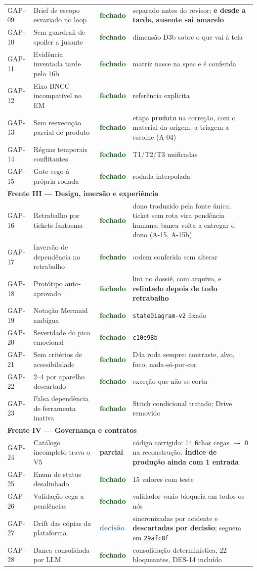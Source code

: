 \documentclass[11pt,a4paper]{article}
\newcommand{\ok}{\textcolor{DarkGreen}{\textbf{fechado}}}
\newcommand{\parcial}{\textcolor{DarkYellow}{\textbf{parcial}}}
\newcommand{\decisao}{\textcolor{SteelBlue}{\textbf{decisão}}}
\newcommand{\amarelo}{\textcolor{DarkYellow}{\textbf{amarelo}}}
\begin{document}
\begin{longtable}{@{}p{1.5cm} p{6.0cm} p{1.6cm} p{6.0cm}@{}}
GAP-09 & Brief de escopo esvaziado no loop & \ok & separado antes do revisor; \textbf{e desde a tarde, ausente sai \amarelo{}} \\
GAP-10 & Sem guardrail de spoiler a jusante & \ok & dimensão D3b sobre o que vai à tela \\
GAP-11 & Evidência inventada tarde pelo 16b & \ok & matriz nasce na spec e é conferida \\
GAP-12 & Eixo BNCC incompatível no EM & \ok & referência explícita \\
GAP-13 & Sem reexecução parcial de produto & \ok & etapa \texttt{produto} na correção, com o material da origem; a triagem a escolhe (A-04) \\
GAP-14 & Réguas temporais conflitantes & \ok & T1/T2/T3 unificadas \\
GAP-15 & Gate cego à própria rodada & \ok & rodada interpolada \\
\midrule
\multicolumn{4}{l}{\textbf{\color{NavyBlue}Frente III --- Design, imersão e experiência}} \\
\midrule
GAP-16 & Retrabalho por tickets fantasma & \ok & dono traduzido pela fonte única; ticket sem rota vira pendência humana; banca volta a entregar o dono (A-15, A-15b) \\
GAP-17 & Inversão de dependência no retrabalho & \ok & ordem conferida sem alterar \\
GAP-18 & Protótipo auto-aprovado & \ok & lint no dossiê, com arquivo, e \textbf{relintado depois de todo retrabalho} \\
GAP-19 & Notação Mermaid ambígua & \ok & \texttt{stateDiagram-v2} fixado \\
GAP-20 & Severidade do pico emocional & \ok & \texttt{c10e98b} \\
GAP-21 & Sem critérios de acessibilidade & \ok & D4a roda sempre: contraste, alvo, foco, nada-só-por-cor \\
GAP-22 & 2--4 por aparelho descartado & \ok & exceção que não se corta \\
GAP-23 & Falsa dependência de ferramenta inativa & \ok & Stitch condicional tratado; Drive removido \\
\midrule
\multicolumn{4}{l}{\textbf{\color{NavyBlue}Frente IV --- Governança e contratos}} \\
\midrule
GAP-24 & Catálogo incompleto trava o V5 & \parcial & código corrigido: 14 fichas cegas $\rightarrow$ 0 na reconstrução. \textbf{Índice de produção ainda com 1 entrada} \\
GAP-25 & Enum de status desalinhado & \ok & 15 valores com teste \\
GAP-26 & Validação cega a pendências & \ok & validador vazio bloqueia em todos os nós \\
GAP-27 & Drift das cópias da plataforma & \decisao & sincronizadas por acidente e \textbf{descartadas por decisão}; seguem em \texttt{29afc8f} \\
GAP-28 & Banca consolidada por LLM & \ok & consolidação determinística, 22 bloqueantes, DES-14 incluído \\
\end{longtable}
\normalsize
\end{document}
